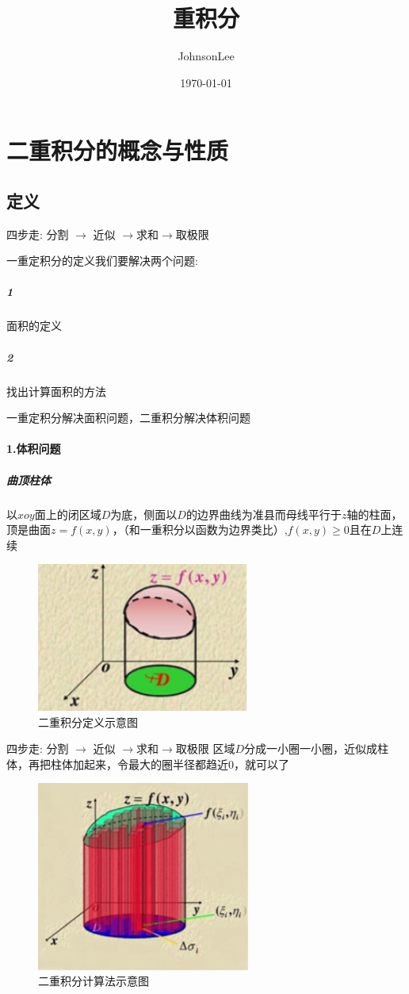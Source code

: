 \documentclass{ctexart}
\author{JohnsonLee}
\title{重积分}
\date{\today}
\begin{document}
  \begin{titlepage}
    \maketitle
    \tableofcontents
  \end{titlepage}
  \section{二重积分的概念与性质}
  \subsection{定义}
    四步走: 分割 $\rightarrow$ 近似 $\rightarrow$求和$\rightarrow$取极限

    一重定积分的定义我们要解决两个问题:\subparagraph{1} 面积的定义\subparagraph{2} 找出计算面积的方法

    一重定积分解决面积问题，二重积分解决体积问题

    \paragraph{1.体积问题}
      \subparagraph{曲顶柱体}
      以$xoy$面上的闭区域$D$为底，侧面以$D$的边界曲线为准县而母线平行于$z$轴的柱面，顶是曲面$z = f(x,y)$，（和一重积分以函数为边界类比）,$f(x,y) \ge 0$且在$D$上连续
      \begin{figure}[htbp]
        \centering
        \caption{二重积分定义示意图}
        \includegraphics[width = 7cm]{PictrueNote/Volume.png}
      \end{figure}
    四步走: 分割 $\rightarrow$ 近似 $\rightarrow$求和$\rightarrow$取极限
    区域$D$分成一小圈一小圈，近似成柱体，再把柱体加起来，令最大的圈半径都趋近0，就可以了\quad
      \begin{figure}[htb]
        \centering
        \caption{二重积分计算法示意图}
        \includegraphics[width = 7cm]{PictrueNote/Howtosum.png}
      \end{figure}
\end{document}
